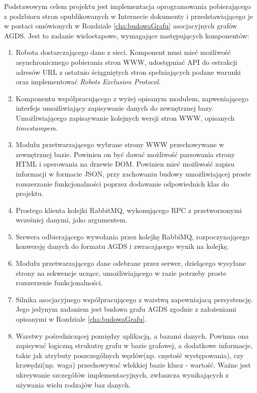 Podstawowym celem projektu jest implementacja oprogramowania pobierającego z podzbioru stron opublikowanych w Internecie dokumenty i przedstawiającego
je w postaci omówionych w Rozdziale \ref{cha:budowaGrafu} asocjacyjnych grafów AGDS. Jest to zadanie wieloetapowe, wymagające następujących komponentów:
\begin{enumerate}
\item Robota dostarczającego dane z sieci. Komponent musi mieć możliwość asynchronicznego pobierania stron WWW, udostępniać API do estrakcji adresów URL z ostatnio
ściągniętych stron spełniających podane warunki oraz implementować \emph{Robots Exclusion Protocol}.
\item Komponentu współpracującego z wyżej opisanym modułem, zapweniającego interfejs umożliwiający zapisywanie danych do zewnętrznej bazy. Umożliwiającego
zapisaywanie kolejnych wersji stron WWW, opisanych \emph{timestampem}.
\item Modułu przetwarzającego wybrane strony WWW przechowywane w zewnętrznej bazie. Powinien on być dawać możliwość parsowania strony HTML i operowania na drzewie DOM.
Powinien mieć możliwość zapisu informacji w formacie JSON, przy zachowaniu budowy umożliwiającej proste rozszerzanie funkcjonalności poprzez dodawanie odpowiednich klas do projektu.
\item Prostego klienta kolejki RabbitMQ, wykonującego RPC z przetworzonymi wcześniej danymi, jako argumentem.
\item Serwera odbierającego wywołania przez kolejkę RabbiMQ, rozpoczynającego konwersję danych do formatu AGDS i zwracającego wynik na kolejkę.
\item Modułu przetwarzającego dane odebrane przez serwer, dzielącego wysyłane strony na sekwencje uczące, umożliwiającego w razie potrzeby proste rozszerzenie funkcjonalności.
\item Silnika asocjacyjnego współpracującego z warstwą zapewniajacą persystencję. Jego jedynym zadaniem jest budowa grafu AGDS zgodnie z założeniami opisanymi w Rozdziale
\ref{cha:budowaGrafu}.
\item Warstwy pośredniczącej pomiędzy aplikacją, a bazami danych. Powinna ona zapisywać logiczną strukutrę grafu w bazie grafowej, a dodatkowe informacje, takie jak
atrybuty poszczególnych węzłów(np. częstość występowania), czy krawędzi(np. waga) przechowywać wlekkiej bazie klucz - wartość. Ważne jest ukreywanie szczegółów implementacyjnych,
zwłaszcza wynikających z używania wielu rodzajów baz danych.
\end{enumerate}

